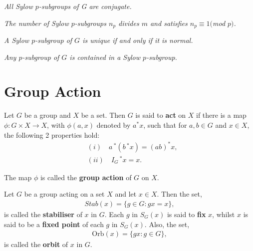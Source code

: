 \begin{theorem} 
\leanok
\textit{All Sylow $p$-subgroups of G are conjugate.} \\
\end{theorem}

\begin{theorem} 
\leanok
\textit{The number of Sylow $p$-subgroups $n_p$ divides $m$ and satisfies $n_p \equiv 1 ($mod $p)$.} \\
\end{theorem}

\begin{corollary}
\leanok    
\label{4thsylow} \textit{A Sylow $p$-subgroup of $G$ is unique if and only if it is normal.} \\
\end{corollary}

\begin{corollary}\label{5thsylow} \textit{Any $p$-subgroup of $G$ is contained in a Sylow $p$-subgroup.} \\
\end{corollary}

\section{Group Action}

\begin{definition} Let $G$ be a group and $X$ be a set. Then $G$ is said to \textbf{act} on $X$ if there is a map $\phi : G \times X \rightarrow X$, with $\phi(a,x)$ denoted by $a^*x$, such that for $a,b \in G$ and $x \in X$, the following 2 properties hold:
\begin{align*} &(i) \quad a\,^*(b\,^*x) = (ab)^*x,
\\  &(ii) \quad I_G\,^*x = x.
\end{align*}

The map $\phi$ is called the \textbf{group action} of $G$ on $X$.
\end{definition}

\begin{definition} Let $G$ be a group acting on a set $X$ and let $x \in X$. Then the set,
\begin{align*} Stab(x) = \{ g \in G  :  gx = x \},
\end{align*}
is called the \textbf{stabiliser} of $x$ in $G$. Each $g$ in $S_G(x)$ is said to \textbf{fix} $x$, whilst $x$ is said to be a \textbf{fixed point} of each $g$ in $S_G(x)$. Also, the set,
\begin{align*} \text{Orb}(x) = \{ gx : g \in G \},
\end{align*}
is called the \textbf{orbit} of $x$ in $G$.  
\end{definition} 

